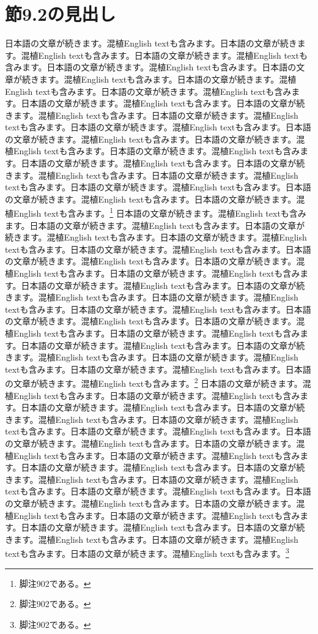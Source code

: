 \documentclass[pdflatex,book]{jlreq}
\begin{document}
\section{節9.2の見出し}
日本語の文章が続きます。混植English textも含みます。日本語の文章が続きます。混植English textも含みます。日本語の文章が続きます。混植English textも含みます。日本語の文章が続きます。混植English textも含みます。日本語の文章が続きます。混植English textも含みます。日本語の文章が続きます。混植English textも含みます。日本語の文章が続きます。混植English textも含みます。日本語の文章が続きます。混植English textも含みます。日本語の文章が続きます。混植English textも含みます。日本語の文章が続きます。混植English textも含みます。日本語の文章が続きます。混植English textも含みます。日本語の文章が続きます。混植English textも含みます。日本語の文章が続きます。混植English textも含みます。日本語の文章が続きます。混植English textも含みます。日本語の文章が続きます。混植English textも含みます。日本語の文章が続きます。混植English textも含みます。日本語の文章が続きます。混植English textも含みます。日本語の文章が続きます。混植English textも含みます。日本語の文章が続きます。混植English textも含みます。日本語の文章が続きます。混植English textも含みます。\footnote{脚注902である。}
日本語の文章が続きます。混植English textも含みます。日本語の文章が続きます。混植English textも含みます。日本語の文章が続きます。混植English textも含みます。日本語の文章が続きます。混植English textも含みます。日本語の文章が続きます。混植English textも含みます。日本語の文章が続きます。混植English textも含みます。日本語の文章が続きます。混植English textも含みます。日本語の文章が続きます。混植English textも含みます。日本語の文章が続きます。混植English textも含みます。日本語の文章が続きます。混植English textも含みます。日本語の文章が続きます。混植English textも含みます。日本語の文章が続きます。混植English textも含みます。日本語の文章が続きます。混植English textも含みます。日本語の文章が続きます。混植English textも含みます。日本語の文章が続きます。混植English textも含みます。日本語の文章が続きます。混植English textも含みます。日本語の文章が続きます。混植English textも含みます。日本語の文章が続きます。混植English textも含みます。日本語の文章が続きます。混植English textも含みます。日本語の文章が続きます。混植English textも含みます。\footnote{脚注902である。}
日本語の文章が続きます。混植English textも含みます。日本語の文章が続きます。混植English textも含みます。日本語の文章が続きます。混植English textも含みます。日本語の文章が続きます。混植English textも含みます。日本語の文章が続きます。混植English textも含みます。日本語の文章が続きます。混植English textも含みます。日本語の文章が続きます。混植English textも含みます。日本語の文章が続きます。混植English textも含みます。日本語の文章が続きます。混植English textも含みます。日本語の文章が続きます。混植English textも含みます。日本語の文章が続きます。混植English textも含みます。日本語の文章が続きます。混植English textも含みます。日本語の文章が続きます。混植English textも含みます。日本語の文章が続きます。混植English textも含みます。日本語の文章が続きます。混植English textも含みます。日本語の文章が続きます。混植English textも含みます。日本語の文章が続きます。混植English textも含みます。日本語の文章が続きます。混植English textも含みます。日本語の文章が続きます。混植English textも含みます。日本語の文章が続きます。混植English textも含みます。\footnote{脚注902である。}
\end{document}
